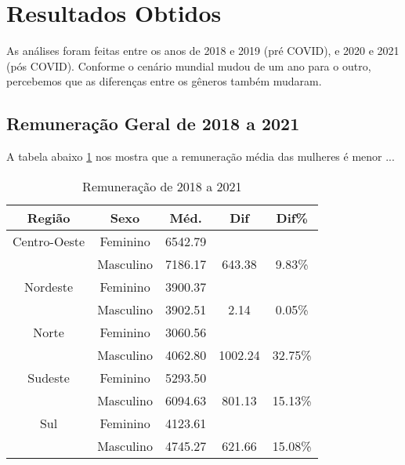 \section{Resultados Obtidos}

As análises foram feitas entre os anos de 2018 e 2019 (pré COVID), e 2020 e 2021 (pós COVID). Conforme o cenário mundial mudou de um ano para o outro, percebemos que as diferenças entre os gêneros também mudaram.

\subsection{Remuneração Geral de 2018 a 2021}

A tabela abaixo \ref{remunTotal} nos mostra que a remuneração média das mulheres é menor ...

\begin{table}[htbp]
	\caption{Remuneração de 2018 a 2021}
	\begin{center}
		\begin{tabular}{|c|c|c|c|c|}
			\hline
			\textbf{Região} & \textbf{Sexo} & \textbf{Méd.} & \textbf{Dif} & \textbf{Dif\%} \\ 
			\hline																			
																																																																							
			Centro-Oeste     & Feminino      & 6542.79        &              &                \\ 
			                 & Masculino     & 7186.17        & 643.38       & 9.83\%         \\ \hline
			Nordeste         & Feminino      & 3900.37        &              &                \\ 
			                 & Masculino     & 3902.51        & 2.14         & 0.05\%         \\ \hline
			Norte            & Feminino      & 3060.56        &              &                \\ 
			                 & Masculino     & 4062.80        & 1002.24      & 32.75\%        \\ \hline
			Sudeste          & Feminino      & 5293.50        &              &                \\ 
			                 & Masculino     & 6094.63        & 801.13       & 15.13\%        \\ \hline
			Sul              & Feminino      & 4123.61        &              &                \\ 
			                 & Masculino     & 4745.27        & 621.66       & 15.08\%        \\ 
			\hline
		\end{tabular}
		\label{remunTotal}
	\end{center}
\end{table}

